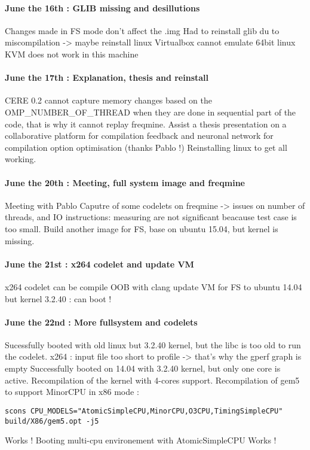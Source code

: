 \documentclass{article}
\begin{document}
\paragraph{June the 16th : GLIB missing and desillutions}
Changes made in FS mode don't affect the .img
Had to reinstall glib du to miscompilation -> maybe reinstall linux
Virtualbox cannot emulate 64bit linux
KVM does not work in this machine

\paragraph{June the 17th : Explanation, thesis and reinstall}
CERE 0.2 cannot capture memory changes based on the OMP\_NUMBER\_OF\_THREAD when they are done in sequential part of the code, that is why it cannot replay freqmine.
Assist a thesis presentation on a collaborative platform for compilation feedback and neuronal network for compilation option optimisation (thanks Pablo !)
Reinstalling linux to get all working.

\paragraph{June the 20th : Meeting, full system image and freqmine}
Meeting with Pablo
Caputre of some codelets on freqmine -> issues on number of threads, and IO instructions: measuring are not significant beacause test case is too small.
Build another image for FS, base on ubuntu 15.04, but kernel is missing.

\paragraph{June the 21st : x264 codelet and update VM}
x264 codelet can be compile OOB with clang
update VM for FS to ubuntu 14.04 but kernel 3.2.40 : can boot !

\paragraph{June the 22nd : More fullsystem and codelets}
Sucessfully booted with old linux but 3.2.40 kernel, but the libc is too old to run the codelet.
x264 : input file too short to profile -> that's why the gperf graph is empty
Successfully booted on 14.04 with 3.2.40 kernel, but only one core is active.
Recompilation of the kernel with 4-cores support.
Recompilation of gem5 to support MinorCPU in x86 mode :
\begin{lstlisting}
scons CPU_MODELS="AtomicSimpleCPU,MinorCPU,O3CPU,TimingSimpleCPU" 
build/X86/gem5.opt -j5
\end{lstlisting}
Works !
Booting multi-cpu environement with AtomicSimpleCPU Works !
\end{document}

